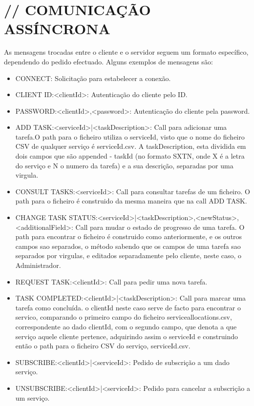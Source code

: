 \documentclass[12pt]{article}
\begin{document}
\section{// COMUNICAÇÃO ASSÍNCRONA}
As mensagens trocadas entre o cliente e o servidor seguem um formato específico, dependendo do pedido efectuado. Alguns exemplos de mensagens são:
\begin{itemize}
\item CONNECT: Solicitação para estabelecer a conexão.
\item CLIENT ID:<clientId>: Autenticação do cliente pelo ID.
\item PASSWORD:<clientId>,<password>: Autenticação do cliente pela password.
\item ADD TASK:<serviceId>|<taskDescription>: Call para adicionar uma tarefa.O path para o ficheiro utiliza o serviceId, visto que o nome do ficheiro CSV de qualquer serviço é serviceId.csv. A taskDescription, esta dividida em dois campos que são appended - taskId (no formato SXTN, onde X é a letra do serviço e N o numero da tarefa) e a sua descrição, separadas por uma virgula.
\item CONSULT TASKS:<serviceId>: Call para consultar tarefas de um ficheiro. O path para o ficheiro é construido da mesma maneira que na call ADD TASK.
\item CHANGE TASK STATUS:<serviceId>|<taskDescription>,<newStatus>,<additionalField>: Call para mudar o estado de progresso de uma tarefa. O path para encontrar o ficheiro é construido como anteriormente, e os outros campos sao separados, o método sabendo que os campos de uma tarefa sao separados por virgulas, e editados separadamente pelo cliente, neste caso, o Administrador.
\item REQUEST TASK:<clientId>: Call para pedir uma nova tarefa.
\item TASK COMPLETED:<clientId>|<taskDescription>: Call para marcar uma tarefa como concluída. o clientId neste caso serve de facto para encontrar o servico, comparando o primeiro campo do ficheiro serviceallocations.csv, correspondente ao dado clientId, com o segundo campo, que denota a que serviço aquele cliente pertence, adquirindo assim o serviceId e construindo então o path para o ficheiro CSV do serviço, serviceId.csv.
\item SUBSCRIBE:<clientId>|<serviceId>: Pedido de subscrição a um dado serviço.
\item UNSUBSCRIBE:<clientId>|<serviceId>: Pedido para cancelar a subscrição a um serviço.
\end{itemize}
\end{document}
